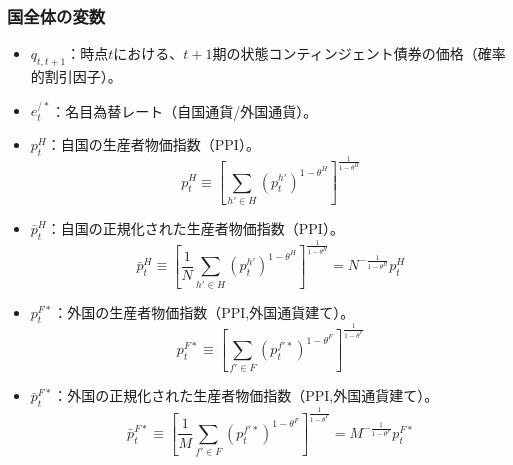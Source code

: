 \subsubsection*{国全体の変数}
\label{sec:model_variables_endogenous_aggregate}
\begin{itemize}
    \item
    \label{itm:model_variables_endogenous_aggregate_q}
        \(q_{t,t+1}\)：時点\(t\)における、\(t+1\)期の状態コンティンジェント債券の価格（確率的割引因子）。
    \item
    \label{itm:model_variables_endogenous_aggregate_e_star}
        \(e_t^{/*}\)：名目為替レート（自国通貨/外国通貨）。
    \item
    \label{itm:model_variables_endogenous_aggregate_p_H}
        \(p_t^H\)：自国の生産者物価指数（PPI）。
        \begin{equation}
        \label{form:model_variables_endogenous_aggregate_p_H_def}
            p_t^H\equiv\left[\sum_{h'\in H}(p_t^{h'})^{1-\theta^H}\right]^{\frac{1}{1-\theta^H}}
        \end{equation}
    \item
    \label{itm:model_variables_endogenous_aggregate_p_H_bar}
        \(\bar{p}_t^H\)：自国の正規化された生産者物価指数（PPI）。
        \begin{equation}
        \label{form:model_variables_endogenous_aggregate_p_H_bar_def}
            \bar{p}_t^H\equiv\left[\frac{1}{N}\sum_{h'\in H}(p_t^{h'})^{1-\theta^H}\right]^{\frac{1}{1-\theta^H}}=N^{-\frac{1}{1-\theta^H}}p_t^H
        \end{equation}
    \item
    \label{itm:model_variables_endogenous_aggregate_p_F_star}
        \(p_t^{F*}\)：外国の生産者物価指数（PPI,外国通貨建て）。
        \begin{equation}
        \label{form:model_variables_endogenous_aggregate_p_F_star_def}
            p_t^{F*}\equiv\left[\sum_{f'\in F}(p_t^{f'*})^{1-\theta^F}\right]^{\frac{1}{1-\theta^F}}
        \end{equation}
    \item
    \label{itm:model_variables_endogenous_aggregate_p_F_star_bar}
        \(\bar{p}_t^{F*}\)：外国の正規化された生産者物価指数（PPI,外国通貨建て）。
        \begin{equation}
        \label{form:model_variables_endogenous_aggregate_p_F_star_bar_def}
            \bar{p}_t^{F*}\equiv\left[\frac{1}{M}\sum_{f'\in F}(p_t^{f'*})^{1-\theta^F}\right]^{\frac{1}{1-\theta^F}}=M^{-\frac{1}{1-\theta^F}}p_t^{F*}

\end{equation}
\end{itemize}
